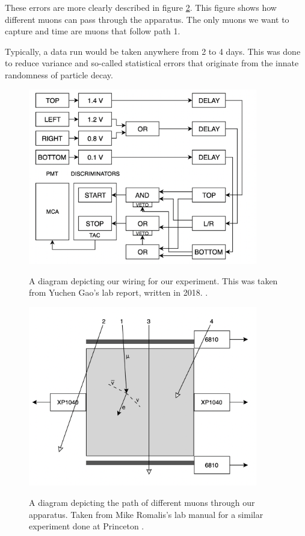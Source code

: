 \documentclass[10pt,letterpaper,onecolumn]{article}
\begin{document}
These errors are more clearly described in figure \ref{fig:error}. This figure shows how different muons can pass through the apparatus. The only muons we want to capture and time are muons that follow path 1. 

Typically, a data run would be taken anywhere from 2 to 4 days. This was done to reduce variance and so-called statistical errors that originate from the innate randomness of particle decay.
\begin{figure}[hbt!]
    \begin{center}
        {{\includegraphics[width=10cm]{BoxDiagram.png} }}%
        \caption{A diagram depicting our wiring for our experiment. This was taken from Yuchen Gao's lab report, written in 2018. \cite{gao2018measurement}.}%
        \label{fig:box}%
    \end{center}
\end{figure}

\begin{figure}[hbt!]
    \begin{center}
        {{\includegraphics[width=10cm]{errorbox.png} }}%
        \caption{A diagram depicting the path of different muons through our apparatus. Taken from Mike Romalis's lab manual for a similar experiment done at Princeton \cite{princeton}.}%
        \label{fig:error}%
    \end{center}
\end{figure}
\end{document}
